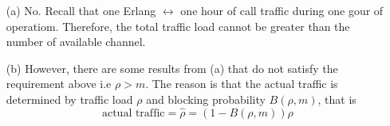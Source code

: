 \vspace{-10pt}
\begin{itemize}
    \item[(a)] No. Recall that one Erlang $\leftrightarrow$ one hour of call traffic during one gour of 
    operatiom. Therefore, the total traffic load cannot be greater than the number of available channel.
    \item[(b)] However, there are some results from (a) that do not satisfy the requirement above i.e $\rho >
    m$. The reason is that the actual traffic is determined by traffic load $\rho$ and blocking probability 
    $B(\rho, m)$, that is
    \begin{equation*}
        \text{actual traffic} = \hat{\rho} = (1 - B(\rho, m)) \rho
    \end{equation*}
\end{itemize}